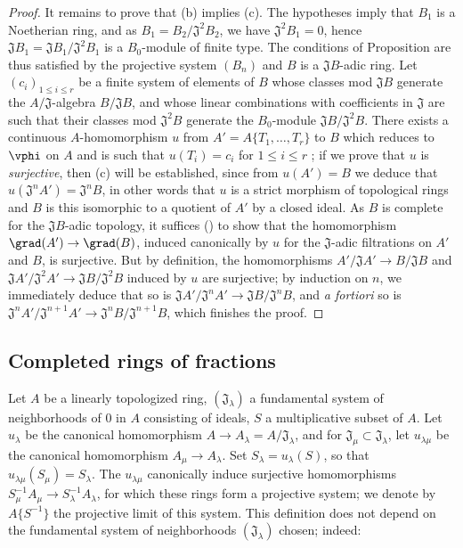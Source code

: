 \begin{proof}
It remains to prove that (b) implies (c). The hypotheses imply that $B_1$ is a Noetherian ring, and
as $B_1=B_2/\mathfrak{J}^2 B_2$, we have $\mathfrak{J}^2 B_1=0$, hence
$\mathfrak{J}B_1=\mathfrak{J}B_1/\mathfrak{J}^2 B_1$ is a $B_0$-module of finite type. The
conditions of Proposition  are thus satisfied by the projective
system $(B_n)$ and $B$ is a $\mathfrak{J}B$-adic ring. Let $(c_i)_{1\leq i\leq r}$ be a
finite system of elements of $B$ whose classes mod $\mathfrak{J}B$ generate the
$A/\mathfrak{J}$-algebra $B/\mathfrak{J}B$, and whose linear combinations with coefficients in
$\mathfrak{J}$ are such that their classes mod $\mathfrak{J}^2 B$ generate the $B_0$-module
$\mathfrak{J}B/\mathfrak{J}^2 B$. There exists a continuous $A$-homomorphism $u$ from
$A'=A\{T_1,\dots,T_r\}$ to $B$ which reduces to $\vphi$ on $A$ and is such that $u(T_i)=c_i$ for
$1\leq i\leq r$ ; if we prove that $u$ is \emph{surjective},
then (c) will be established, since from $u(A')=B$ we deduce that
$u(\mathfrak{J}^n A')=\mathfrak{J}^n B$, in other words that $u$ is a strict morphism of topological
rings and $B$ is this isomorphic to a quotient of $A'$ by a closed ideal. As $B$ is complete for the
$\mathfrak{J}B$-adic topology, it suffices (\cite[p.~18--07]{I-1}) to show that the homomorphism
$\grad(A')\to\grad(B)$, induced canonically by $u$ for the $\mathfrak{J}$-adic filtrations on
$A'$ and $B$, is surjective. But by definition, the homomorphisms
$A'/\mathfrak{J}A'\to B/\mathfrak{J}B$ and
$\mathfrak{J}A'/\mathfrak{J}^2 A'\to\mathfrak{J}B/\mathfrak{J}^2 B$ induced by $u$ are surjective;
by induction on $n$, we immediately deduce that so is
$\mathfrak{J}A'/\mathfrak{J}^n A'\to\mathfrak{J}B/\mathfrak{J}^n B$, and \emph{a fortiori} so is
$\mathfrak{J}^n A'/\mathfrak{J}^{n+1}A'\to\mathfrak{J}^n B/\mathfrak{J}^{n+1}B$, which finishes the
proof.
\end{proof}

\subsection{Completed rings of fractions}
\label{subsection:0.7.6}

\begin{env}[7.6.1]
\label{0.7.6.1}
Let $A$ be a linearly topologized ring, $(\mathfrak{J}_\lambda)$ a fundamental system of
neighborhoods of $0$ in $A$ consisting of ideals, $S$ a multiplicative subset of $A$. Let
$u_\lambda$ be the canonical homomorphism $A\to A_\lambda=A/\mathfrak{J}_\lambda$, and for
$\mathfrak{J}_\mu\subset\mathfrak{J}_\lambda$, let $u_{\lambda\mu}$ be the canonical
homomorphism $A_\mu\to A_\lambda$. Set $S_\lambda=u_\lambda(S)$, so that
$u_{\lambda\mu}(S_\mu)=S_\lambda$. The $u_{\lambda\mu}$ canonically induce surjective
homomorphisms $S_\mu^{-1}A_\mu\to S_\lambda^{-1}A_\lambda$, for which these rings form a
projective system; we denote by $A\{S^{-1}\}$ the projective limit of this system. This
definition does not depend on the fundamental system of neighborhoods $(\mathfrak{J}_\lambda)$
chosen; indeed:
\end{env}

